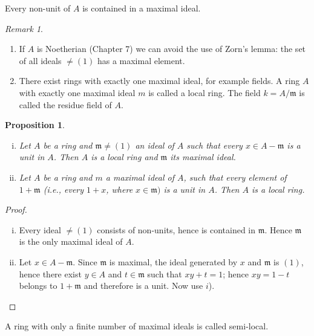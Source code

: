 \documentclass[class=book, crop=false]{standalone}
\newtheorem{proposition}[theorem]{Proposition}
\theoremstyle{definition}
\theoremstyle{remark}
\newtheorem*{remark}{Remark}
\begin{document}
\begin{corollary}\label{cor:1.5}
  Every non-unit of $A$ is contained in a maximal ideal.
\end{corollary}
\begin{remark}
  \begin{enumerate}
    \item If $A$ is Noetherian (Chapter 7) we can avoid the use of Zorn's lemma:
          the set of all ideals $\neq(1)$ has a maximal element.
    \item There exist rings with exactly one maximal ideal, for example fields.
          A ring $A$ with exactly one maximal ideal $m$ is called a local ring.
          The field $k=A / \mathfrak{m}$ is called the residue field of $A$.
  \end{enumerate}
\end{remark}
\begin{proposition}\label{prop:1.6}
  \begin{enumerate}[i)]
    \item Let $A$ be a ring and $\mathfrak{m} \neq(1)$ an ideal of $A$ such that
          every $x \in A-\mathfrak{m}$ is a unit in $A$. Then $A$ is a local
          ring and $\mathfrak{m}$ its maximal ideal.
    \item Let $A$ be a ring and $m$ a maximal ideal of $A$, such that every
          element of $1+\mathfrak{m}$ (i.e., every $1+x$, where
          $x \in \mathfrak{m})$ is a unit in $A$. Then $A$ is a local ring.
  \end{enumerate}
\end{proposition}
\begin{proof}
  \begin{enumerate}[i)]
    \item Every ideal $\neq(1)$ consists of non-units, hence is contained in
          $\mathfrak{m}$. Hence $\mathfrak{m}$ is the only maximal ideal of $A$.
    \item Let $x \in A-\mathfrak{m}$. Since $\mathfrak{m}$ is maximal, the ideal
          generated by $x$ and $\mathfrak{m}$ is $(1)$, hence there exist
          $y \in A$ and $t \in \mathfrak{m}$ such that $x y+t=1$; hence
          $x y=1-t$ belongs to $1+\mathfrak{m}$ and therefore is a unit. Now use
          $i$).
  \end{enumerate}
\end{proof}
A ring with only a finite number of maximal ideals is called semi-local.
\end{document}
